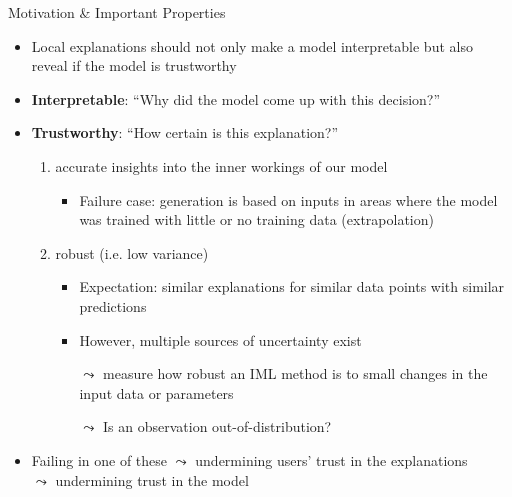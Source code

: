 \documentclass[10pt,compress,t,notes=noshow, xcolor=table]{beamer}
\begin{document}
\begin{frame}{Motivation \& Important Properties}
	\begin{itemize}
		\item Local explanations should not only make a model interpretable but also reveal if the model is trustworthy
	    \pause
	    \item \textbf{Interpretable}: ``Why did the model come up with this decision?''
	    \pause
	    \item \textbf{Trustworthy}: ``How certain is this explanation?''
	    \begin{enumerate}
	        \item accurate insights into the inner workings of our model
	        \begin{itemize}
	            \item Failure case: generation is based on inputs in areas where the model was trained with little or no training data (extrapolation)
	        \end{itemize}
	        \pause
	        \item robust (i.e. low variance)
	        \begin{itemize}
	            \item Expectation: similar explanations for similar data points with similar predictions
	            \item However, multiple sources of uncertainty exist
	            \item[$\leadsto$] measure how robust an IML method is to small changes in the input data or parameters
	            \item[$\leadsto$] Is an observation out-of-distribution?
	        \end{itemize}
	    \end{enumerate}
	    \pause
		\item Failing in one of these $\leadsto$ undermining users' trust in the explanations\\ $\leadsto$ undermining trust in the model 
	\end{itemize}
\end{frame}
\end{document}
